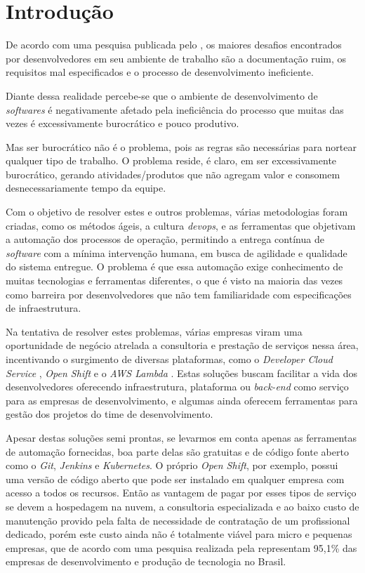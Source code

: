 \documentclass[
	12pt,				%
	openright,			%
	oneside,			%
	a4paper,			%
	english,			%
	french,				%
	spanish,			%
	brazil,				%
	]{abntex2}
\begin{document}
\chapter{Introdução}
De acordo com uma pesquisa publicada pelo , os maiores desafios encontrados por desenvolvedores em seu ambiente de trabalho são a documentação ruim, os requisitos mal especificados e o processo de desenvolvimento ineficiente.

Diante dessa realidade percebe-se que o ambiente de desenvolvimento de \textit{softwares} é negativamente afetado pela ineficiência do processo que muitas das vezes é excessivamente burocrático e pouco produtivo.

\begin{citacao}
Mas ser burocrático não é o problema, pois as regras são necessárias para nortear qualquer tipo de trabalho. O problema reside, é claro, em ser excessivamente burocrático, gerando atividades/produtos que não agregam valor e consomem desnecessariamente tempo da equipe. \cite{EBusiness:ManifestoAgil}
\end{citacao}

Com o objetivo de resolver estes e outros problemas, várias metodologias foram criadas, como os métodos ágeis, a cultura \textit{devops}, e as ferramentas que objetivam a automação dos processos de operação, permitindo a entrega contínua de \textit{software} com a mínima intervenção humana, em busca de agilidade e qualidade do sistema entregue. O problema é que essa automação exige conhecimento de muitas tecnologias e ferramentas diferentes, o que é visto na maioria das vezes como barreira por desenvolvedores que não tem familiaridade com especificações de infraestrutura.

Na tentativa de resolver estes problemas, várias empresas viram uma oportunidade de negócio atrelada a consultoria e prestação de serviços nessa área, incentivando o surgimento de diversas plataformas, como o \textit{Developer Cloud Service} \cite{Oracle:DevOps}, \textit{Open Shift} \cite{RedHat:OpenShift} e o \textit{AWS Lambda} \cite{Amazon:Lambda}. Estas soluções buscam facilitar a vida dos desenvolvedores oferecendo infraestrutura, plataforma ou \textit{back-end} como serviço para as empresas de desenvolvimento, e algumas ainda oferecem ferramentas para gestão dos projetos do time de desenvolvimento.

Apesar destas soluções semi prontas, se levarmos em conta apenas as ferramentas de automação fornecidas, boa parte delas são gratuitas e de código fonte aberto como o \textit{Git}, \textit{Jenkins} e \textit{Kubernetes}. O próprio \textit{Open Shift}, por exemplo, possui uma versão de código aberto que pode ser instalado em qualquer empresa com acesso a todos os recursos. Então as vantagem de pagar por esses tipos de serviço se devem a hospedagem na nuvem, a consultoria especializada e ao baixo custo de manutenção provido pela falta de necessidade de contratação de um profissional dedicado, porém este custo ainda não é totalmente viável para micro e pequenas empresas, que de acordo com uma pesquisa realizada pela  representam 95,1\% das empresas de desenvolvimento e produção de tecnologia no Brasil.
\end{document}
